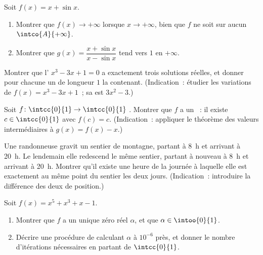 \begin{exercise}[$\star\star$]\label{exo:g12:limcont:5}
Soit $f(x) = x + \sin x$.
\begin{enumerate}
  \item Montrer que $f(x) \to +\infty$ lorsque $x \to +\infty$, bien que
        $f$ ne soit  sur aucun  $\intco{A}{+\infty}$.
  \item Montrer que $g(x) = \dfrac{x + \sin x}{x - \sin x}$ tend vers $1$
        en $+\infty$.
\end{enumerate}
\end{exercise}

\begin{exercise}[$\star\star$]\label{exo:g12:limcont:6}
Montrer que l' $x^3 - 3x + 1 = 0$ a exactement trois solutions
réelles, et donner pour chacune un  de longueur $1$ la
contenant. (Indication~: étudier les variations de
$f(x) = x^3 - 3x + 1$~; sa  est $3x^2 - 3$.)
\end{exercise}

\begin{exercise}[$\star\star$]\label{exo:g12:limcont:7}
Soit $f \colon \intcc{0}{1} \to \intcc{0}{1}$ . Montrer que $f$ a
un \emph{}~: il existe $c \in \intcc{0}{1}$ avec $f(c) = c$.
(Indication~: appliquer le théorème des valeurs intermédiaires à
$g(x) = f(x) - x$.)
\end{exercise}

\begin{exercise}[$\star\star\star$]\label{exo:g12:limcont:8}
Une randonneuse gravit un sentier de montagne, partant à 8~h et arrivant à
20~h. Le lendemain elle redescend le même sentier, partant à nouveau à 8~h
et arrivant à 20~h. Montrer qu'il existe une heure de la journée à laquelle
elle est exactement au même point du sentier les deux jours. (Indication~:
introduire la différence des deux  de position.)
\end{exercise}

\begin{exercise}[$\star\star\star$]\label{exo:g12:limcont:9}
Soit $f(x) = x^5 + x^3 + x - 1$.
\begin{enumerate}
  \item Montrer que $f$ a un unique zéro réel $\alpha$, et que
        $\alpha \in \intoo{0}{1}$.
  \item Décrire une procédure de  calculant $\alpha$ à
        $10^{-6}$ près, et donner le nombre d'itérations nécessaires en
        partant de $\intcc{0}{1}$.
\end{enumerate}
\end{exercise}

